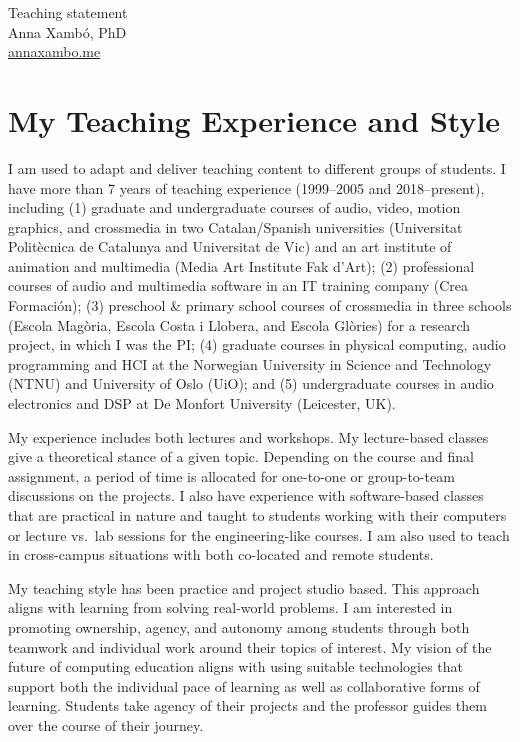 \documentclass[10pt, a4paper]{article}
\begin{document}
{\LARGE Teaching statement}\\[0.2cm]
Anna Xambó, PhD\\
\href{http://annaxambo.me}{annaxambo.me}

\section*{My Teaching Experience and Style}

I am used to adapt and deliver teaching content to different groups of students. I have more than 7 years of teaching experience (1999--2005 and 2018--present), including (1) graduate and undergraduate courses of audio, video, motion graphics, and crossmedia in two Catalan/Spanish universities (Universitat Politècnica de Catalunya and Universitat de Vic) and an art institute of animation and multimedia (Media Art Institute Fak d’Art); (2) professional courses of audio and multimedia software in an IT training company (Crea Formación); (3) preschool \& primary school courses of crossmedia in three schools (Escola Magòria, Escola Costa i Llobera, and Escola Glòries) for a research project, in which I was the PI;  (4) graduate courses in physical computing, audio programming and HCI at the Norwegian University in Science and Technology (NTNU) and University of Oslo (UiO); and (5) undergraduate courses in audio electronics and DSP at De Monfort University (Leicester, UK).

My experience includes both lectures and workshops. My lecture-based classes give a theoretical stance of a given topic. Depending on the course and final assignment, a period of time is allocated for one-to-one or group-to-team discussions on the projects. I also have experience with software-based classes that are practical in nature and taught to students working with their computers or lecture vs.\ lab sessions for the engineering-like courses. I am also used to teach in cross-campus situations with both co-located and remote students.

My teaching style has been practice and project studio based. This approach aligns with learning from solving real-world problems. I am interested in promoting ownership, agency, and autonomy among students through both teamwork and individual work around their topics of interest. My vision of the future of computing education aligns with using suitable technologies that support both the individual pace of learning as well as collaborative forms of learning. Students take agency of their projects and the professor guides them over the course of their journey. 
\end{document}
